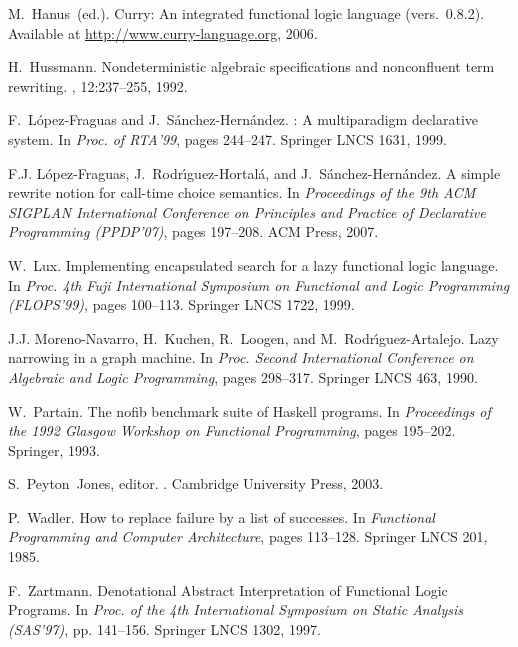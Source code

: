 \documentclass{llncs}
\begin{document}
\begin{thebibliography}{10}
M.~Hanus~(ed.).
\newblock Curry: An integrated functional logic language (vers.\ 0.8.2).
\newblock Available at \url{http://www.curry-language.org}, 2006.

H.~Hussmann.
\newblock Nondeterministic algebraic specifications and nonconfluent term
  rewriting.
, 12:237--255, 1992.

F.~L\'opez-Fraguas and J.~S\'anchez-Hern\'andez.
: A multiparadigm declarative system.
\newblock In {\em Proc. of RTA'99}, pages 244--247. Springer LNCS 1631, 1999.

F.J. L{\'o}pez-Fraguas, J.~Rodr{\'\i}guez-Hortal{\'a}, and
  J.~S{\'a}nchez-Hern{\'a}ndez.
\newblock A simple rewrite notion for call-time choice semantics.
\newblock In {\em Proceedings of the 9th ACM SIGPLAN International Conference
  on Principles and Practice of Declarative Programming (PPDP'07)}, pages
  197--208. ACM Press, 2007.

W.~Lux.
\newblock Implementing encapsulated search for a lazy functional logic
  language.
\newblock In {\em Proc. 4th Fuji International Symposium on Functional and
  Logic Programming (FLOPS'99)}, pages 100--113. Springer LNCS 1722, 1999.

J.J. M{oreno-Navarro}, H.~Kuchen, R.~Loogen, and M.~R{odr{\'\i}guez-Artalejo}.
\newblock Lazy narrowing in a graph machine.
\newblock In {\em Proc. Second International Conference on Algebraic and Logic
  Programming}, pages 298--317. Springer LNCS 463, 1990.

W.~Partain.
\newblock The nofib benchmark suite of {H}askell programs.
\newblock In {\em Proceedings of the 1992 Glasgow Workshop on Functional
  Programming}, pages 195--202. Springer, 1993.

S.~Peyton~Jones, editor.
.
\newblock Cambridge University Press, 2003.

P.~Wadler.
\newblock How to replace failure by a list of successes.
\newblock In {\em Functional Programming and Computer Architecture}, pages
  113--128. Springer LNCS 201, 1985.

F.~Zartmann.
\newblock Denotational Abstract Interpretation of Functional Logic Programs.
\newblock In {\em Proc. of the 4th International Symposium on Static Analysis
  (SAS'97)}, pp. 141--156. Springer LNCS 1302, 1997.

\end{thebibliography}
\end{document}
